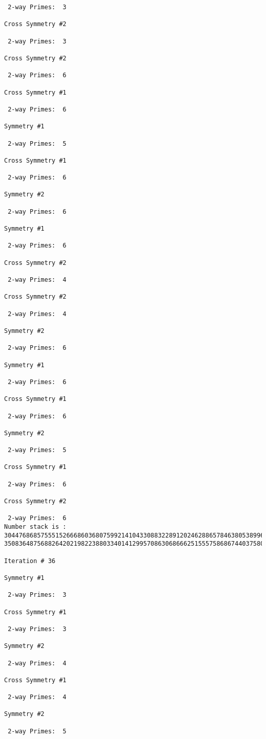 \begin{verbatim}
 2-way Primes: 	3

Cross Symmetry #2

 2-way Primes: 	3

Cross Symmetry #2

 2-way Primes: 	6

Cross Symmetry #1

 2-way Primes: 	6

Symmetry #1

 2-way Primes: 	5

Cross Symmetry #1

 2-way Primes: 	6

Symmetry #2

 2-way Primes: 	6

Symmetry #1

 2-way Primes: 	6

Cross Symmetry #2

 2-way Primes: 	4

Cross Symmetry #2

 2-way Primes: 	4

Symmetry #2

 2-way Primes: 	6

Symmetry #1

 2-way Primes: 	6

Cross Symmetry #1

 2-way Primes: 	6

Symmetry #2

 2-way Primes: 	5

Cross Symmetry #1

 2-way Primes: 	6

Cross Symmetry #2

 2-way Primes: 	6
Number stack is :
30447686857555152666860368075992141043308832289120246288657846380538996794608835958544046240163340857
35083648756882642021982238803340141299570863068666251555758686744037580433610426404458595388064976998

Iteration #	36

Symmetry #1

 2-way Primes: 	3

Cross Symmetry #1

 2-way Primes: 	3

Symmetry #2

 2-way Primes: 	4

Cross Symmetry #1

 2-way Primes: 	4

Symmetry #2

 2-way Primes: 	5


\end{verbatim}
